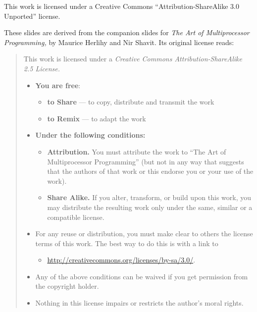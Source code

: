 \documentclass{beamer}
\begin{document}
\begin{frame}{}{}
\vskip4pt
\parskip=4pt
\scriptsize
This work is licensed under a Creative Commons “Attribution-ShareAlike
3.0 Unported” license.

These slides are derived from the companion slides for \emph{The Art of
Multiprocessor Programming,} by Maurice Herlihy and Nir Shavit. Its
original license reads:
\begin{quote}
  This work is licensed under a \emph{Creative Commons Attribution-ShareAlike
  2.5 License.}
\begin{itemize}
  \item \textbf{You are free}:
    \begin{itemize}
      \item\tiny \textbf{to Share} — to copy, distribute and transmit the work
        \item\tiny \textbf{to Remix} — to adapt the work
    \end{itemize}
  \item \textbf{Under the following conditions:}
    \begin{itemize}
      \item\tiny \textbf{Attribution.} You must attribute the work to “The Art of
        Multiprocessor Programming” (but not in any way that suggests
        that the authors of that work or this endorse you or your use of
        the work).
      \item\tiny \textbf{Share Alike.} If you alter, transform, or build upon this work,
        you may distribute the resulting work only under the same,
        similar or a compatible license.
    \end{itemize}
  \item For any reuse or distribution, you must make clear to others the
    license terms of this work. The best way to do this is with a link to
    \begin{itemize}
      \item\tiny \url{http://creativecommons.org/licenses/by-sa/3.0/}.
    \end{itemize}
  \item Any of the above conditions can be waived if you get permission from
    the copyright holder.
  \item Nothing in this license impairs or restricts the author’s moral
    rights.
\end{itemize}
\end{quote}
\end{frame}
\end{document}

